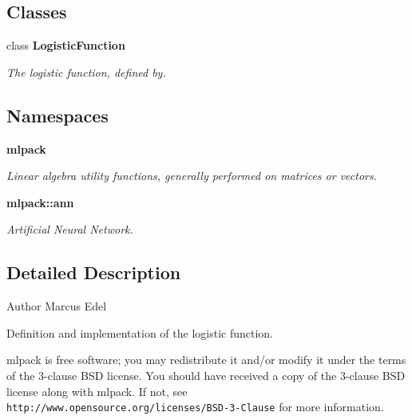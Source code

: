 \subsection*{Classes}
\begin{DoxyCompactItemize}
\item 
class \textbf{ Logistic\+Function}
\begin{DoxyCompactList}\small\item\em The logistic function, defined by. \end{DoxyCompactList}\end{DoxyCompactItemize}
\subsection*{Namespaces}
\begin{DoxyCompactItemize}
\item 
 \textbf{ mlpack}
\begin{DoxyCompactList}\small\item\em Linear algebra utility functions, generally performed on matrices or vectors. \end{DoxyCompactList}\item 
 \textbf{ mlpack\+::ann}
\begin{DoxyCompactList}\small\item\em Artificial Neural Network. \end{DoxyCompactList}\end{DoxyCompactItemize}


\subsection{Detailed Description}
\begin{DoxyAuthor}{Author}
Marcus Edel
\end{DoxyAuthor}
Definition and implementation of the logistic function.

mlpack is free software; you may redistribute it and/or modify it under the terms of the 3-\/clause B\+SD license. You should have received a copy of the 3-\/clause B\+SD license along with mlpack. If not, see {\tt http\+://www.\+opensource.\+org/licenses/\+B\+S\+D-\/3-\/\+Clause} for more information. 